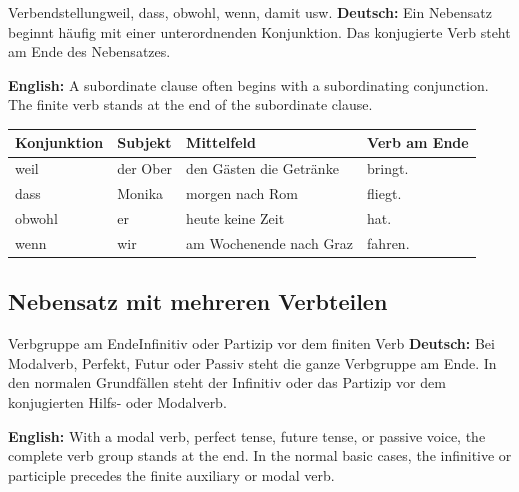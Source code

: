 \documentclass[a4paper,11pt]{article}
\newcommand{\GermanText}[1]{\textbf{Deutsch: }#1\par}
\newcommand{\EnglishText}[1]{{\small\color{SoftGray}\textbf{English: }#1\par}}
\newcommand{\TableHeader}[1]{\color{white}\textbf{#1}}
\begin{document}
        \begin{grammarentry}{Verbendstellung}{weil, dass, obwohl, wenn, damit usw.}
            \GermanText{Ein Nebensatz beginnt häufig mit einer unterordnenden Konjunktion. Das konjugierte Verb steht am Ende des Nebensatzes.}
            \EnglishText{A subordinate clause often begins with a subordinating conjunction. The finite verb stands at the end of the subordinate clause.}
        \end{grammarentry}
        
        \begin{longtable}{|p{2.8cm}|p{2.8cm}|p{6.0cm}|p{3.0cm}|}
            \hline
            \rowcolor{HeaderBlueDark}
            \TableHeader{Konjunktion} & \TableHeader{Subjekt} & \TableHeader{Mittelfeld} & \TableHeader{Verb am Ende} \\
            \hline
            weil & der Ober & den Gästen die Getränke & bringt. \\
            \hline
            dass & Monika & morgen nach Rom & fliegt. \\
            \hline
            obwohl & er & heute keine Zeit & hat. \\
            \hline
            wenn & wir & am Wochenende nach Graz & fahren. \\
            \hline
        \end{longtable}
        
        \subsection{Nebensatz mit mehreren Verbteilen}
            
            \begin{grammarentry}{Verbgruppe am Ende}{Infinitiv oder Partizip vor dem finiten Verb}
                \GermanText{Bei Modalverb, Perfekt, Futur oder Passiv steht die ganze Verbgruppe am Ende. In den normalen Grundfällen steht der Infinitiv oder das Partizip vor dem konjugierten Hilfs- oder Modalverb.}
                \EnglishText{With a modal verb, perfect tense, future tense, or passive voice, the complete verb group stands at the end. In the normal basic cases, the infinitive or participle precedes the finite auxiliary or modal verb.}
            \end{grammarentry}
            
\end{document}
